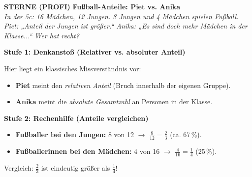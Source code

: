 \documentclass[a4paper,10pt]{article}
\newcommand{\mFrac}[2]{\frac{#1}{#2}}
\begin{document}
\begin{tcolorbox}[
    enhanced, colback=white, colframe=primaryBlue, arc=3mm, boxrule=1.2pt,
    left=4.5mm, right=4.5mm, top=2.5mm, bottom=2.5mm, height=12.9cm
]
    \begin{center}
        {\color{lvlPurple}\textbf{\faStar\faStar\faStar{} STERNE (PROFI)}}\quad
        {\color{primaryBlue}\large\bfseries {}\quad Fußball-Anteile: Piet vs. Anika}\\[1mm]
        {\footnotesize\textit{In der 5c: 16 Mädchen, 12 Jungen. 8 Jungen und 4 Mädchen spielen Fußball. Piet: „Anteil der Jungen ist größer.“ Anika: „Es sind doch mehr Mädchen in der Klasse...“ Wer hat recht?}}
    \end{center}
    \vspace{0.5mm}

    \begin{tcolorbox}[colback=step1Bg, colframe=step1Border, arc=2mm, boxrule=0.7pt, left=3mm, right=3mm, top=1.8mm, bottom=1.8mm]
        {\color{step1Text}\bfseries\faLightbulb\enskip Stufe 1: Denkanstoß (Relativer vs. absoluter Anteil)}\\[0.8mm]
        {\small
        Hier liegt ein klassisches Missverständnis vor:
        \begin{itemize}[leftmargin=4mm, itemsep=0.2pt, topsep=1pt]
            \item \textbf{Piet} meint den \textit{relativen Anteil} (Bruch innerhalb der eigenen Gruppe).
            \item \textbf{Anika} meint die \textit{absolute Gesamtzahl} an Personen in der Klasse.
        \end{itemize}
        }
    \end{tcolorbox}
    \vspace{0.8mm}

    \begin{tcolorbox}[colback=step2Bg, colframe=step2Border, arc=2mm, boxrule=0.7pt, left=3mm, right=3mm, top=1.8mm, bottom=1.8mm]
        {\color{step2Text}\bfseries\faSearch\enskip Stufe 2: Rechenhilfe (Anteile vergleichen)}\\[0.8mm]
        {\small
        \begin{itemize}[leftmargin=4mm, itemsep=0.2pt, topsep=1pt]
            \item \textbf{Fußballer bei den Jungen:} 8 von 12 $\rightarrow$ $\mFrac{8}{12} = \mFrac{2}{3}$ (ca. 67\,\%).
            \item \textbf{Fußballerinnen bei den Mädchen:} 4 von 16 $\rightarrow$ $\mFrac{4}{16} = \mFrac{1}{4}$ (25\,\%).
        \end{itemize}
        Vergleich: $\mFrac{2}{3}$ ist eindeutig größer als $\mFrac{1}{4}$!
        }
    \end{tcolorbox}
    \vspace{0.8mm}


\end{tcolorbox}
\end{document}
